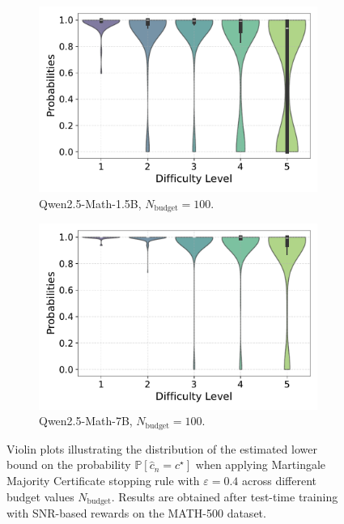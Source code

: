 \begin{figure}[h!]
\begin{subfigure}{0.49\textwidth}
      \includegraphics[width=\textwidth]{figs/QWEN-MATH-1.5B_violin_maj100_probability_adaptive_04_NO_ground_truth.pdf}
        \caption{Qwen2.5-Math-1.5B, $N_{\text{budget}}=100$.}
      \label{fig:QWEN-MATH-1.5B_budget_100_NO_04}
  \end{subfigure}
  \hfill
  \begin{subfigure}{0.49\textwidth}
      \centering
      \includegraphics[width=\textwidth]{figs/QWEN-MATH-7B_violin_maj100_probability_adaptive_04_NO_ground_truth.pdf}
        \caption{Qwen2.5-Math-7B, $N_{\text{budget}}=100$.}
      \label{fig:QWEN-MATH-7B_budget_100_NO_04}
  \end{subfigure}
  \caption{Violin plots illustrating the distribution of the estimated lower bound on the probability $\mathbb{P}[\widehat{c}_n = c^\star]$ when applying Martingale Majority Certificate stopping rule with $\varepsilon = 0.4$ across different budget values $N_{\text{budget}}$. 
   Results are obtained after test-time training with SNR-based rewards on the MATH-500 dataset.}
  \label{fig:violin_plots_NO_ground_truth_04}
\end{figure}


